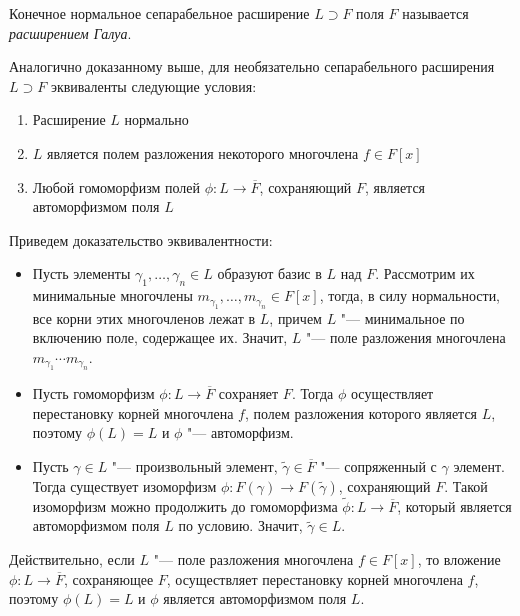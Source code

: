 \begin{definition}
	Конечное нормальное сепарабельное расширение $L \supset F$ поля $F$ называется \textit{расширением Галуа}.
\end{definition}

\begin{note}
	Аналогично доказанному выше, для необязательно сепарабельного расширения $L \supset F$ эквиваленты следующие условия:
	\begin{enumerate}
		\item Расширение $L$ нормально
		\item $L$ является полем разложения некоторого многочлена $f \in F[x]$
		\item Любой гомоморфизм полей $\phi: L \to \overline{F}$, сохраняющий $F$, является автоморфизмом поля $L$
	\end{enumerate}
	
	Приведем доказательство эквивалентности:
	\begin{itemize}
		\item{}Пусть элементы $\gamma_1, \dots, \gamma_n \in L$ образуют базис в $L$ над $F$. Рассмотрим их минимальные многочлены $m_{\gamma_1}, \dotsc, m_{\gamma_n} \in F[x]$, тогда, в силу нормальности, все корни этих многочленов лежат в $L$, причем $L$ "--- минимальное по включению поле, содержащее их. Значит, $L$ "--- поле разложения многочлена $m_{\gamma_1}\dotsm m_{\gamma_n}$.
		
		\item{}Пусть гомоморфизм $\phi: L \to \overline{F}$ сохраняет $F$. Тогда $\phi$ осуществляет перестановку корней многочлена $f$, полем разложения которого является $L$, поэтому $\phi(L) = L$ и $\phi$ "--- автоморфизм.
		
		\item{}Пусть $\gamma \in L$ "--- произвольный элемент, $\widetilde\gamma \in \overline{F}$ "--- сопряженный с $\gamma$ элемент. Тогда существует изоморфизм $\phi: F(\gamma) \to F(\widetilde\gamma)$, сохраняющий $F$. Такой изоморфизм можно продолжить до гомоморфизма $\widetilde\phi : L \to \overline{F}$, который является автоморфизмом поля $L$ по условию. Значит, $\widetilde\gamma \in L$.
	\end{itemize}

	Действительно, если $L$ "--- поле разложения многочлена $f \in F[x]$, то вложение $\phi: L \to \overline{F}$, сохраняющее $F$, осуществляет перестановку корней многочлена $f$, поэтому $\phi(L) = L$ и $\phi$ является автоморфизмом поля $L$.
\end{note}

